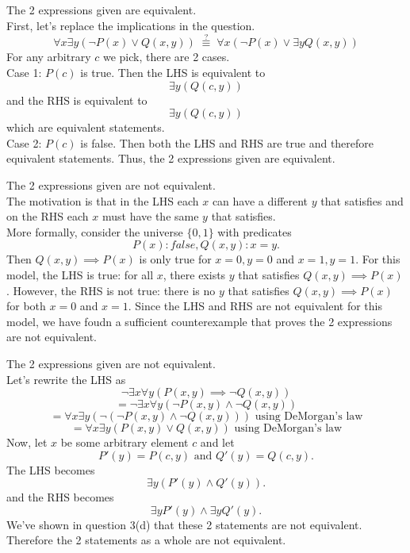 \documentclass[11pt]{article}
\begin{document}
\begin{solution}
\begin{Parts}
\Part 
The 2 expressions given are equivalent.
\\First, let's replace the implications in the question.
$$\forall x \exists y (\lnot P(x)\lor Q(x,y)) 
\;\overset{?}{\equiv}\; 
\forall x (\lnot P(x)\lor \exists yQ(x,y))$$
For any arbitrary $c$ we pick, there are 2 cases.
\\Case 1: $P(c)$ is true. Then the LHS is equivalent to
$$\exists y(Q(c,y))$$ and the RHS is equivalent to
$$\exists y(Q(c,y))$$ which are equivalent statements.
\\Case 2: $P(c)$ is false. Then both the LHS and RHS are true
and therefore equivalent statements.
Thus, the 2 expressions given are equivalent.

\Part
The 2 expressions given are not equivalent.
\\The motivation is that in the LHS each $x$ can have a different $y$ that satisfies
and on the RHS each $x$ must have the same $y$ that satisfies.
\\More formally, consider the universe $\{0,1\}$ with predicates
$$P(x):false, Q(x,y):x=y.$$ 
Then $Q(x,y)\implies P(x)$ is only true for $x=0,y=0$ and $x=1,y=1$.
For this model, the LHS is true: for all $x$, there exists $y$ that satisfies $Q(x,y)\implies P(x)$.
However, the RHS is not true: there is no $y$ that satisfies $Q(x,y)\implies P(x)$ for both $x=0$ and $x=1$.
Since the LHS and RHS are not equivalent for this model, we have foudn a sufficient counterexample that proves the 2 expressions are not equivalent.

\Part
The 2 expressions given are not equivalent.
\\Let's rewrite the LHS as
$$\lnot\exists x\forall y(P(x,y)\implies\lnot Q(x,y))$$
$$=\lnot\exists x\forall y(\lnot P(x,y)\land \lnot Q(x,y))$$
$$=\forall x\exists y(\lnot(\lnot P(x,y)\land \lnot Q(x,y)))\text{ using DeMorgan's law}$$
$$=\forall x\exists y(P(x,y)\lor Q(x,y))\text{ using DeMorgan's law}$$
Now, let $x$ be some arbitrary element $c$ 
and let $$P'(y)=P(c,y)\text{ and }Q'(y)=Q(c,y).$$
The LHS becomes $$\exists y(P'(y)\land Q'(y)).$$
and the RHS becomes $$\exists yP'(y)\land\exists yQ'(y).$$
We've shown in question 3(d) that these 2 statements are not equivalent.
Therefore the 2 statements as a whole are not equivalent.
\end{Parts}
\end{solution}

\newpage {}
\end{document}
